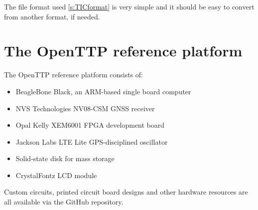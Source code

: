 	The file format used \ref{s:TICformat} is very simple and it should be easy to convert from another format, if needed.
	
\section{The OpenTTP reference platform}

The OpenTTP reference platform consists of:
\begin{itemize}
\item BeagleBone Black, an ARM-based single board computer
\item NVS Technologies NV08-CSM GNSS receiver
\item Opal Kelly XEM6001 FPGA development board
\item Jackson Labs LTE Lite GPS-disciplined oscillator
\item Solid-state disk for mass storage
\item CrystalFontz LCD module
\end{itemize}

Custom circuits, printed circuit board designs and other hardware resources are all available via the GitHub repository.